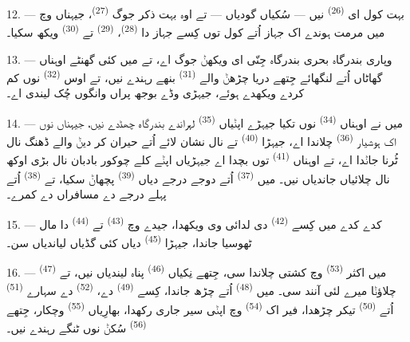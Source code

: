 12. --- بہت کول ای  \textsuperscript{(26)} نیں — سُکیاں گودیاں —
تے اوہ بہت ذکر جوگ  \textsuperscript{(27)}، جیہناں وچ میں
مرمت ہوندے اک جہاز اُتے کول توں کِسے جہاز دا  \textsuperscript{(28)}،
 \textsuperscript{(29)} تے  \textsuperscript{(30)} ویکھ
سکیا۔

13. --- وپاری بندرگاہ بحری بندرگاہ جِنّی ای ویکھݨ جوگ اے، تے میں کئی گھنٹے اوہناں
گھاٹاں اُتے لنگھائے جِتھے دریا چڑھݨ والے 
\textsuperscript{(31)} بنھے رہندے نیں، تے اوس  \textsuperscript{(32)}
نوں کم کردے ویکھدے ہوئے، جیہڑی وڈے بوجھ پراں وانگوں چُک لیندی اے۔

\VUsaut{4.0mm}
\VUsaut{3.0mm}

14. --- میں نے اوہناں  \textsuperscript{(34)} نوں تکیا
جیہڑے اپݨیاں  \textsuperscript{(35)} لہراندے بندرگاہ چھڈدے نیں،
جیہناں نوں اک ہوشیار  \textsuperscript{(36)} چلاندا اے، جیہڑا
 \textsuperscript{(40)} تے  نال نشان لائے
 اُتے حیران کر دیݨ والے ڈھنگ نال ٹُرنا جاݨدا اے، تے اوہناں
 \textsuperscript{(41)} توں بچدا اے جیہڑیاں اپݨے کلے چوکور بادبان
نال بڑی اوکھ نال چلائیاں جاندیاں نیں۔ میں  \textsuperscript{(37)}
اُتے دوجے درجے دیاں  \textsuperscript{(39)} پچھاݨ سکیا، تے
 \textsuperscript{(38)} اُتے پہلے درجے دے مسافراں دے کمرے۔

15. --- کدے کدے میں کِسے  \textsuperscript{(42)} دی لدائی وی
ویکھدا، جیدے وچ  \textsuperscript{(43)} تے
 \textsuperscript{(44)} دا مال ٹھوسیا جاندا، جیہڑا
 \textsuperscript{(45)} دیاں کئی گڈیاں لیاندیاں سن۔

\VUsaut{3.0mm}
\VUsaut{3.0mm}

16. --- میں اکثر  \textsuperscript{(53)} وچ کشتی چلاندا سی، جِتھے
نِکیاں  \textsuperscript{(46)} پناہ لیندیاں نیں، تے 
\textsuperscript{(47)} چلاؤݨا میرے لئی آنند سی۔ میں 
\textsuperscript{(48)} اُتے چڑھ جاندا، کِسے  \textsuperscript{(49)}
دے،  \textsuperscript{(52)} دے سہارے  \textsuperscript{(51)}
اُتے  \textsuperscript{(50)} تیکر چڑھدا، فیر اک 
\textsuperscript{(54)} وچ اپݨی سیر جاری رکھدا، بھارِیاں 
\textsuperscript{(55)} وچکار، جِتھے  \textsuperscript{(56)} سُکݨ نوں ٹنگے
رہندے نیں۔

